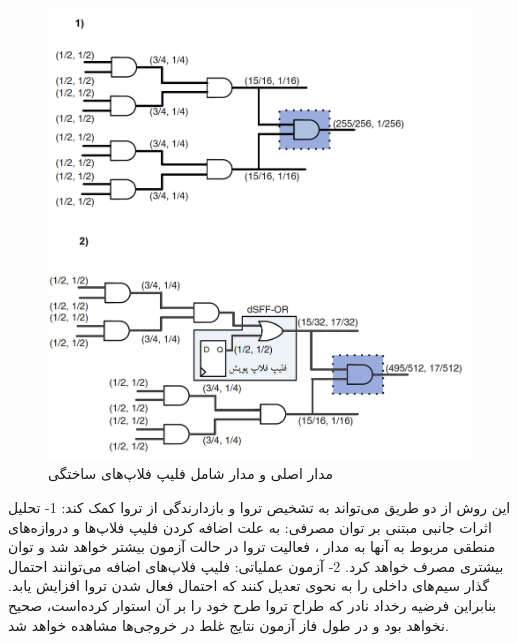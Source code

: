 \begin{figure}
\begin{center}
\includegraphics[scale=0.6]{figs/fig5-5.png}
\caption{مدار اصلی و مدار شامل فلیپ فلاپ‌های ساختگی}
\label{fig5-5}
\end{center}
\end{figure} 
این روش از دو طریق می‌تواند به تشخیص تروا و بازدارندگی از تروا کمک کند:
1-	تحلیل اثرات جانبی مبتنی بر توان مصرفی:
به علت اضافه کردن فلیپ فلاپ‌ها و دروازه‌های منطقی مربوط به آنها به مدار ، فعالیت تروا در حالت آزمون بیشتر خواهد شد و توان بیشتری مصرف خواهد کرد. 
2-	آزمون عملیاتی:
فلیپ فلاپ‌های اضافه می‌توانند احتمال گذار سیم‌های داخلی را به نحوی تعدیل کنند که احتمال فعال شدن تروا افزایش یابد. بنابراین فرضیه رخداد نادر که طراح تروا طرح خود را بر آن استوار کرده‌است، صحیح نخواهد بود و در طول فاز آزمون نتایج غلط در خروجی‌ها مشاهده خواهد شد.

